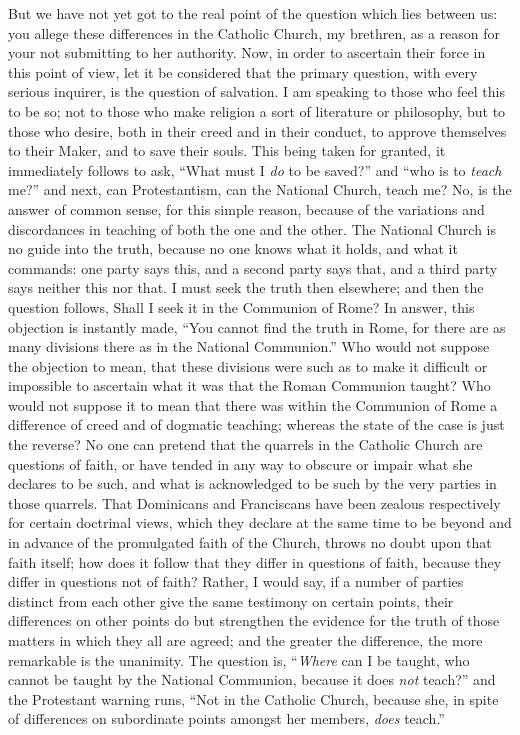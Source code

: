 But we have not yet got to the real point of the question which
lies between us: you allege these differences in the Catholic Church,
my brethren, as a reason for your not submitting to her authority.
Now, in order to ascertain their force in this point of view, let it
be considered that the primary question, with every serious inquirer,
is the question of salvation. I am speaking to those who feel this to
be so; not to those who make religion a sort of literature or
philosophy, but to those who desire, both in their creed and in their
conduct, to approve themselves to their Maker, and to save their
souls. This being taken for granted, it immediately follows to ask,
``What must I \emph{do} to be saved?'' and ``who is to \emph{teach}
me?'' and next, can Protestantism, can the National Church, teach
me? No, is the answer of common sense, for this simple reason, because
of the variations and discordances in teaching of both the one and the
other. The National Church is no guide into the truth, because no one
knows what it holds, and what it commands: one party says this, and a
second party says that, and a third party says neither this nor that.
I must seek the truth then elsewhere; and then the question follows,
Shall I seek it in the Communion of Rome? In answer, this objection is
instantly made, ``You cannot find the truth in Rome, for there are
as many divisions there as in the National Communion.'' Who would
not suppose the objection to mean, that these divisions were such as
to make it difficult or impossible to ascertain what it was that the
Roman Communion taught? Who would not suppose it to mean that there
was within the Communion of Rome a difference of creed and of dogmatic
teaching; whereas the state of the case is just the reverse? No one
can pretend that the quarrels in the Catholic Church are questions of
faith, or have tended in any way to obscure or impair what she
declares to be such, and what is acknowledged to be such by the very
parties in those quarrels. That Dominicans and Franciscans have been
zealous respectively for certain doctrinal views, which they declare
at the same time to be beyond and in advance of the promulgated faith
of the Church, throws no doubt upon that faith itself; how does it
follow that they differ in questions of faith, because they differ in
questions not of faith? Rather, I would say, if a number of parties
distinct from each other give the same testimony on certain points,
their differences on other points do but strengthen the evidence for
the truth of those matters in which they all are agreed; and the
greater the difference, the more remarkable is the unanimity. The
question is, ``\emph{Where} can I be taught, who cannot be taught
by the National Communion, because it does \emph{not} teach?'' and
the Protestant warning runs, ``Not in the Catholic Church, because
she, in spite of differences on subordinate points amongst her
members, \emph{does} teach.''

